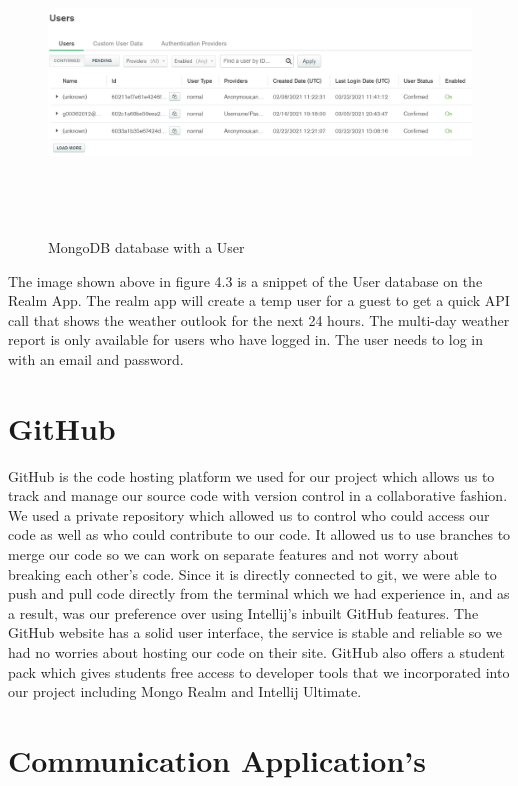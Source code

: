 \begin{figure}[H]
    \centering
    \includegraphics[width=15cm,height = 8cm]{img/Users.PNG}
    \caption{MongoDB database with a User}
    \label{fig:altas config}
\end{figure}
The image shown above in figure 4.3 is a snippet of the User database on the Realm App. The realm app will create a temp user for a guest to get a quick API call that shows the weather outlook for the next 24 hours. The multi-day weather report is only available for users who have logged in. The user needs to log in with an email and password.

\section{GitHub}
GitHub is the code hosting platform we used for our project which allows us to track and manage our source code with version control in a collaborative fashion. We used a private repository which allowed us to control who could access our code as well as who could contribute to our code. It allowed us to use branches to merge our code so we can work on separate features and not worry about breaking each other's code. \newpage
Since it is directly connected to git, we were able to push and pull code directly from the terminal which we had experience in, and as a result, was our preference over using Intellij’s inbuilt GitHub features. The GitHub website has a solid user interface, the service is stable and reliable so we had no worries about hosting our code on their site. GitHub also offers a student pack which gives students free access to developer tools that we incorporated into our project including Mongo Realm and Intellij Ultimate.
\section{Communication Application's}
